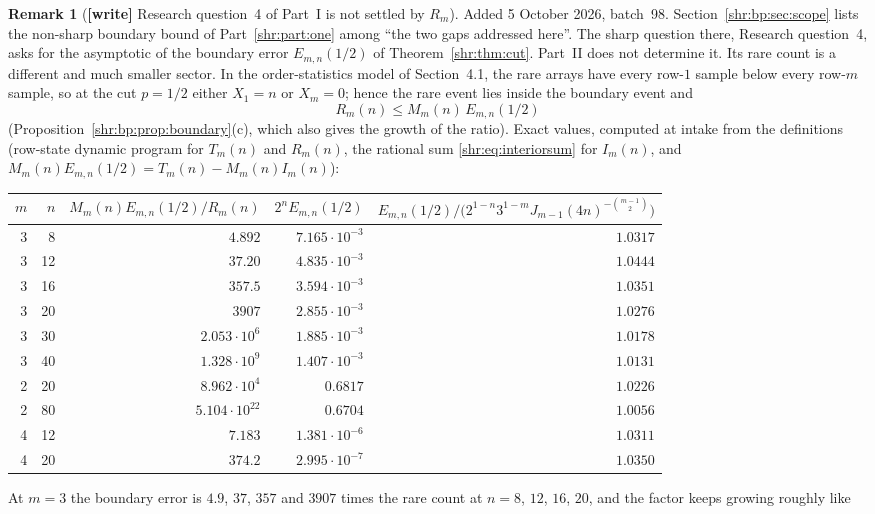 \documentclass[11pt,letterpaper]{article}
\numberwithin{equation}{section}
\theoremstyle{definition}
\newtheorem{remark}[theorem]{Remark}
\newcommand{\1}{\mathbf 1}
\begin{document}
\begin{remark}[\textbf{[write]} Research question~4 of Part~I is not settled by $R_m$]
\label{shr:bp:rem:q4}
Added 5 October 2026, batch~98. Section~\ref{shr:bp:sec:scope} lists the
non-sharp boundary bound of Part~\ref{shr:part:one} among ``the two gaps
addressed here''. The sharp question there, Research question~4, asks for
the asymptotic of the boundary error $E_{m,n}(1/2)$ of
Theorem~\ref{shr:thm:cut}. Part~II does not determine it. Its rare count
is a different and much smaller sector. In the order-statistics model of
Section~4.1, the rare arrays have every row-$1$ sample below every row-$m$
sample, so at the cut $p=1/2$ either $X_1=n$ or $X_m=0$; hence the rare
event lies inside the boundary event and
\[
 R_m(n)\le M_m(n)\,E_{m,n}(1/2)
\]
(Proposition~\ref{shr:bp:prop:boundary}(c), which also gives the growth
of the ratio). Exact values, computed at intake from the definitions
(row-state dynamic program for $T_m(n)$ and $R_m(n)$, the rational sum
\eqref{shr:eq:interiorsum} for $I_m(n)$, and
$M_m(n)E_{m,n}(1/2)=T_m(n)-M_m(n)I_m(n)$):
\begin{center}\small
\begin{tabular}{@{}rrrrr@{}}
\toprule
$m$ & $n$ & $M_m(n)E_{m,n}(1/2)/R_m(n)$ & $2^nE_{m,n}(1/2)$ &
$E_{m,n}(1/2)/\bigl(2^{1-n}3^{1-m}J_{m-1}(4n)^{-\binom{m-1}2}\bigr)$\\
\midrule
3 & 8 & $4.892$ & $7.165\cdot10^{-3}$ & $1.0317$\\
3 & 12 & $37.20$ & $4.835\cdot10^{-3}$ & $1.0444$\\
3 & 16 & $357.5$ & $3.594\cdot10^{-3}$ & $1.0351$\\
3 & 20 & $3907$ & $2.855\cdot10^{-3}$ & $1.0276$\\
3 & 30 & $2.053\cdot10^{6}$ & $1.885\cdot10^{-3}$ & $1.0178$\\
3 & 40 & $1.328\cdot10^{9}$ & $1.407\cdot10^{-3}$ & $1.0131$\\
2 & 20 & $8.962\cdot10^{4}$ & $0.6817$ & $1.0226$\\
2 & 80 & $5.104\cdot10^{22}$ & $0.6704$ & $1.0056$\\
4 & 12 & $7.183$ & $1.381\cdot10^{-6}$ & $1.0311$\\
4 & 20 & $374.2$ & $2.995\cdot10^{-7}$ & $1.0350$\\
\bottomrule
\end{tabular}
\end{center}
At $m=3$ the boundary error is $4.9$, $37$, $357$ and $3907$ times the rare
count at $n=8$, $12$, $16$, $20$, and the factor keeps growing roughly like

\end{remark}
\end{document}
